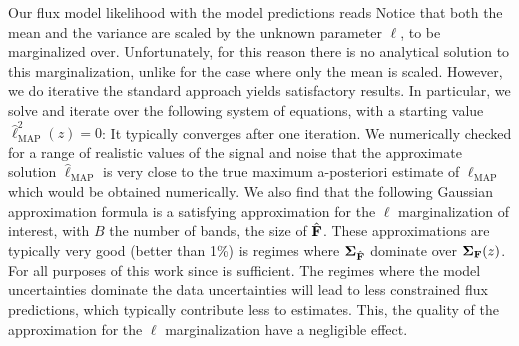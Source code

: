 \documentclass[aps,prd,showpacs,superscriptaddress,groupedaddress]{revtex4}  %
\begin{document}
Our flux model likelihood with the model predictions reads
Notice that both the mean and the variance are scaled by the unknown parameter $\ell$, to be marginalized over. 
Unfortunately, for this reason there is no analytical solution to this marginalization, unlike for the case where only the mean is scaled.
However, we do iterative the standard approach yields satisfactory results.
In particular, we solve and iterate over the following system of equations, with a starting value $\hat{\ell}^2_\mathrm{MAP}(z)  = 0$:
It typically converges after one iteration. 
We numerically checked for a range of realistic values of the signal and noise that the approximate solution $\hat{\ell}_\mathrm{MAP}$ is very close to the true maximum a-posteriori estimate of $\ell_\mathrm{MAP}$ which would be obtained numerically. 
We also find that the following Gaussian approximation formula is a satisfying approximation for the $\ell$ marginalization of interest,
with $B$ the number of bands, \ie the size of $\hat{\mat{F}}$.
These approximations are typically very good (better than 1\%) is regimes where $\mat{\Sigma}_{\hat{\mat{F}}}$ dominate over $\mat{\Sigma_{{\mat{F}}}}(z)$. 
For all purposes of this work since is sufficient. 
The regimes where the model uncertainties dominate the data uncertainties will lead to less constrained flux predictions, which typically contribute less to \photoz estimates.
This, the quality of the approximation for the $\ell$ marginalization have a negligible effect.  
\end{document}
